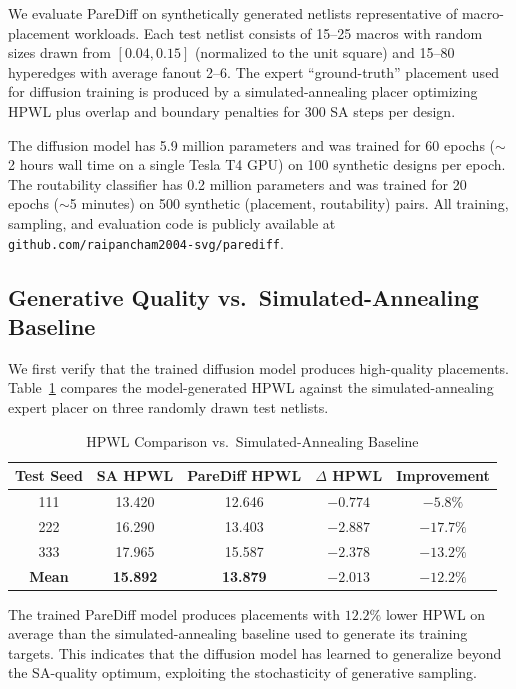 \documentclass{ieeeaccess}
\begin{document}
We evaluate PareDiff on synthetically generated netlists representative of macro-placement workloads. Each test netlist consists of 15--25 macros with random sizes drawn from $[0.04, 0.15]$ (normalized to the unit square) and 15--80 hyperedges with average fanout 2--6. The expert ``ground-truth'' placement used for diffusion training is produced by a simulated-annealing placer optimizing HPWL plus overlap and boundary penalties for 300 SA steps per design.

The diffusion model has 5.9 million parameters and was trained for 60 epochs ($\sim$2 hours wall time on a single Tesla T4 GPU) on 100 synthetic designs per epoch. The routability classifier has 0.2 million parameters and was trained for 20 epochs ($\sim$5 minutes) on 500 synthetic (placement, routability) pairs. All training, sampling, and evaluation code is publicly available at \texttt{github.com/raipancham2004-svg/parediff}.

\subsection{Generative Quality vs.\ Simulated-Annealing Baseline}

We first verify that the trained diffusion model produces high-quality placements. Table~\ref{tab:hpwl_vs_sa} compares the model-generated HPWL against the simulated-annealing expert placer on three randomly drawn test netlists.

\begin{table}[t]
\centering
\caption{HPWL Comparison vs.\ Simulated-Annealing Baseline}
\label{tab:hpwl_vs_sa}
\setlength{\tabcolsep}{4pt}
\begin{tabular}{ccccc}
\toprule
Test Seed & SA HPWL & PareDiff HPWL & $\Delta$ HPWL & Improvement \\
\midrule
111 & 13.420 & 12.646 & $-0.774$ & $-5.8\%$ \\
222 & 16.290 & 13.403 & $-2.887$ & $-17.7\%$ \\
333 & 17.965 & 15.587 & $-2.378$ & $-13.2\%$ \\
\midrule
\textbf{Mean} & \textbf{15.892} & \textbf{13.879} & $\mathbf{-2.013}$ & $\mathbf{-12.2\%}$ \\
\bottomrule
\end{tabular}
\end{table}

The trained PareDiff model produces placements with $12.2\%$ lower HPWL on average than the simulated-annealing baseline used to generate its training targets. This indicates that the diffusion model has learned to generalize beyond the SA-quality optimum, exploiting the stochasticity of generative sampling.
\end{document}
